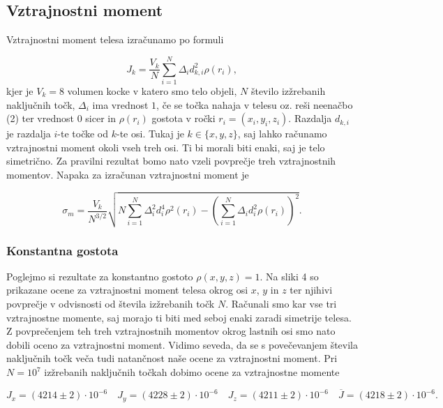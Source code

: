 \documentclass[slovene,11pt,a4paper]{article}
\begin{document}
\subsection{Vztrajnostni moment}

Vztrajnostni moment telesa izračunamo po formuli

\begin{equation}
J_k = \frac{V_k}{N} \sum_{i=1}^N \Delta_i d_{k,i}^2 \rho(r_i),
\end{equation}
kjer je $V_k = 8$ volumen kocke v katero smo telo objeli, $N$ število izžrebanih naključnih točk, $\Delta_i$ ima vrednost $1$, če se točka nahaja v telesu oz. reši neenačbo (2) ter vrednost $0$ sicer in $\rho(r_i)$ gostota v ročki $r_i = (x_i, y_i, z_i)$. Razdalja $d_{k,i}$ je razdalja $i$-te točke od $k$-te osi. Tukaj je $k \in \{x,y,z\}$, saj lahko računamo vztrajnostni moment okoli vseh treh osi. Ti bi morali biti enaki, saj je telo simetrično. Za pravilni rezultat bomo nato vzeli povprečje treh vztrajnostnih momentov. Napaka za izračunan vztrajnostni moment je

\begin{equation}
\sigma_m = \frac{V_k}{N^{3/2}} \sqrt{N\sum_{i=1}^N \Delta_i^2 d_i^4 \rho^2(r_i) - 
\left( \sum_{i=1}^N \Delta_i d_i^2 \rho(r_i) \right)^2}.
\end{equation}

\subsubsection{Konstantna gostota}

Poglejmo si rezultate za konstantno gostoto $\rho(x,y,z)=1$. Na sliki 4 so prikazane ocene za vztrajnostni moment telesa okrog osi $x$, $y$ in $z$ ter njihivi povprečje v odvisnosti od števila izžrebanih točk $N$. Računali smo kar vse tri vztrajnostne momente, saj morajo ti biti med seboj enaki zaradi simetrije telesa. Z povprečenjem teh treh vztrajnostnih momentov okrog lastnih osi smo nato dobili oceno za vztrajnostni moment. Vidimo seveda, da se s povečevanjem števila naključnih točk veča tudi natančnost naše ocene za vztrajnostni moment. Pri $N=10^7$ izžrebanih naključnih točkah dobimo ocene za vztrajnostne momente

\[
J_x = (4214 \pm 2) \cdot 10^{-6} \quad
J_y = (4228 \pm 2) \cdot 10^{-6} \quad
J_z = (4211 \pm 2) \cdot 10^{-6} \quad
\overline{J} = (4218 \pm 2) \cdot 10^{-6}.
\]
\end{document}
